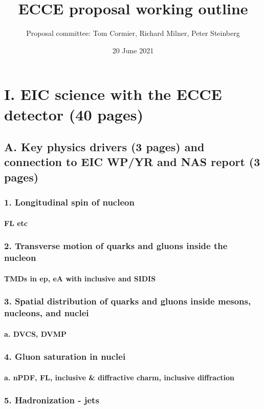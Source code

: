 \documentclass{report}
\title{\bf ECCE proposal working outline}
\author{Proposal committee: Tom Cormier, Richard Milner, Peter Steinberg}
\date{20 June 2021}
\begin{document}
\maketitle
\setcounter{tocdepth}{5}
\tableofcontents
%
\chapter{I. EIC science with the ECCE detector (40 pages)}
%
\section{A. Key physics drivers (3 pages) and connection to EIC WP/YR and NAS report (3 pages)}
\subsection{1. Longitudinal spin of nucleon}
\subsubsection{FL etc}
\subsection{2. Transverse motion of quarks and gluons inside the nucleon}
\subsubsection{TMDs in ep, eA with inclusive and SIDIS}
\subsection{3. Spatial distribution of quarks and gluons inside mesons, nucleons, and nuclei}
\subsubsection{a. DVCS, DVMP}
\subsection{4. Gluon saturation in nuclei}
\subsubsection{a. nPDF, FL, inclusive \& diffractive charm, inclusive diffraction}
\subsection{5. Hadronization - jets}
%
\newpage
\end{document}
